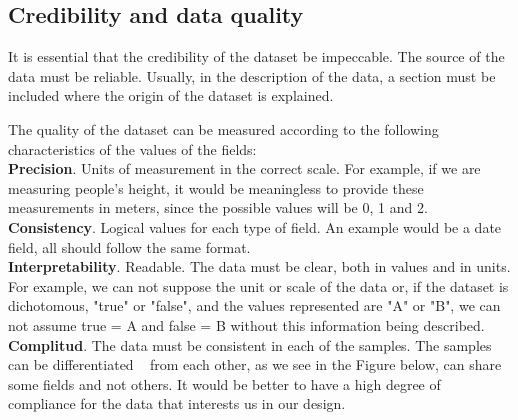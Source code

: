 \subsection{Credibility and data quality}
It is essential that the credibility of the dataset be impeccable. The source of the data must be reliable.
Usually, in the description of the data, a section must be included where the origin of the dataset is explained.

The quality of the dataset can be measured according to the following characteristics of the values of the fields: \\
 
\textbf{Precision}. Units of measurement in the correct scale. For example, if we are measuring people's height, it 
would be meaningless to provide these measurements in meters, since the possible values will be 0, 1 and 2. \\

\textbf{Consistency}. Logical values for each type of field. An example would be a date field, all should
follow the same format. \\

\textbf{Interpretability}. Readable. The data must be clear, both in values and in units. For example, we can not
suppose the unit or scale of the data or, if the dataset is dichotomous, "true" or "false", and the values represented are
"A" or "B", we can not assume true = A and false = B without this information being described. \\

\textbf{Complitud}. The data must be consistent in each of the samples. The samples can be differentiated
  from each other, as we see in the Figure below, can share some fields and not others. It would be
better to have a high degree of compliance for the data that interests us in our design.


